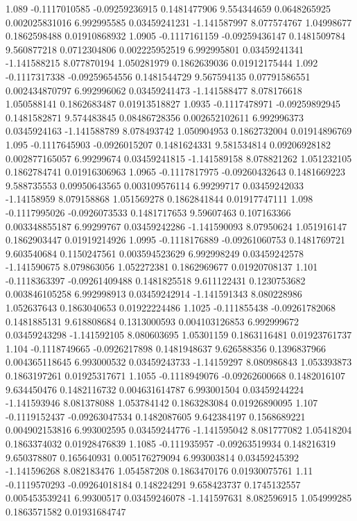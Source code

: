 {1.089 -0.1117010585 -0.09259236915 0.1481477906 9.554344659 0.0648265925 0.002025831016 6.992995585 0.03459241231 -1.141587997 8.077574767 1.04998677 0.1862598488 0.01910868932
1.0905 -0.1117161159 -0.09259436147 0.1481509784 9.560877218 0.0712304806 0.002225952519 6.992995801 0.03459241341 -1.141588215 8.077870194 1.050281979 0.1862639036 0.01912175444
1.092 -0.1117317338 -0.09259654556 0.1481544729 9.567594135 0.07791586551 0.002434870797 6.992996062 0.03459241473 -1.141588477 8.078176618 1.050588141 0.1862683487 0.01913518827
1.0935 -0.1117478971 -0.09259892945 0.1481582871 9.574483845 0.08486728356 0.002652102611 6.992996373 0.0345924163 -1.141588789 8.078493742 1.050904953 0.1862732004 0.01914896769
1.095 -0.1117645903 -0.0926015207 0.1481624331 9.581534814 0.09206928182 0.002877165057 6.99299674 0.03459241815 -1.141589158 8.078821262 1.051232105 0.1862784741 0.01916306963
1.0965 -0.1117817975 -0.09260432643 0.1481669223 9.588735553 0.09950643565 0.003109576114 6.99299717 0.03459242033 -1.14158959 8.079158868 1.051569278 0.1862841844 0.01917747111
1.098 -0.1117995026 -0.0926073533 0.1481717653 9.59607463 0.107163366 0.003348855187 6.99299767 0.03459242286 -1.141590093 8.07950624 1.051916147 0.1862903447 0.01919214926
1.0995 -0.1118176889 -0.09261060753 0.1481769721 9.603540684 0.1150247561 0.003594523629 6.992998249 0.03459242578 -1.141590675 8.079863056 1.052272381 0.1862969677 0.01920708137
1.101 -0.1118363397 -0.09261409488 0.1481825518 9.611122431 0.1230753682 0.003846105258 6.992998913 0.03459242914 -1.141591343 8.080228986 1.052637643 0.1863040653 0.01922224486
1.1025 -0.111855438 -0.09261782068 0.1481885131 9.618808684 0.1313000593 0.004103126853 6.992999672 0.03459243298 -1.141592105 8.080603695 1.05301159 0.1863116481 0.01923761737
1.104 -0.1118749665 -0.0926217898 0.1481948637 9.626588356 0.1396837966 0.004365118645 6.993000532 0.03459243733 -1.14159297 8.080986843 1.053393873 0.1863197261 0.01925317671
1.1055 -0.1118949076 -0.09262600668 0.1482016107 9.634450476 0.1482116732 0.004631614787 6.993001504 0.03459244224 -1.141593946 8.081378088 1.053784142 0.1863283084 0.01926890095
1.107 -0.1119152437 -0.09263047534 0.1482087605 9.642384197 0.1568689221 0.004902153816 6.993002595 0.03459244776 -1.141595042 8.081777082 1.05418204 0.1863374032 0.01928476839
1.1085 -0.111935957 -0.09263519934 0.148216319 9.650378807 0.165640931 0.005176279094 6.993003814 0.03459245392 -1.141596268 8.082183476 1.054587208 0.1863470176 0.01930075761
1.11 -0.1119570293 -0.09264018184 0.148224291 9.658423737 0.1745132557 0.005453539241 6.99300517 0.03459246078 -1.141597631 8.082596915 1.054999285 0.1863571582 0.01931684747
}
